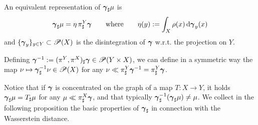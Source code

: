 \documentclass[reqno,11pt]{article}
\numberwithin{equation}{section}
\newcommand{\ggamma}{{\mbox{\boldmath$\gamma$}}}
\renewcommand{\d}{{\mathrm d}}
\newcommand{\Probabilities}[1]{\mathscr P(#1)}          %
\newcommand{\prob}{\Probabilities}
\begin{document}
An equivalent representation of $\ggamma_\sharp\mu$ is
\begin{equation}\label{eq:equivalentpushplan}
\ggamma_\sharp\mu=\eta\,\pi^Y_\sharp\ggamma\qquad\text{where}\qquad
\eta(y):=\int_X\rho(x)\,\d\ggamma_y(x)
\end{equation}
and $\{\ggamma_y\}_{y\in Y}\subset\Probabilities{X}$ is the
disintegration of $\ggamma$ w.r.t. the projection on $Y$.

Defining $\ggamma^{-1}:=(\pi^Y,\pi^X)_\sharp\ggamma\in\prob{Y\times
X}$, we can define in a symmetric way the map
$\nu\mapsto\ggamma^{-1}_\sharp\nu\in\prob{X}$ for any
$\nu\ll\pi^Y_\sharp\ggamma^{-1}=\pi^Y_\sharp\ggamma$.

Notice that if $\ggamma$ is concentrated on the graph of a map
$T:X\to Y$, it holds $\ggamma_\sharp\mu=T_\sharp\mu$ for any
$\mu\ll\pi^X_\sharp\ggamma$, and that typically
$\ggamma^{-1}_\sharp(\ggamma_\sharp\mu)\neq\mu$. We collect in the
following proposition the basic properties of $\ggamma_\sharp$ in
connection with the Wasserstein distance.
\end{document}
